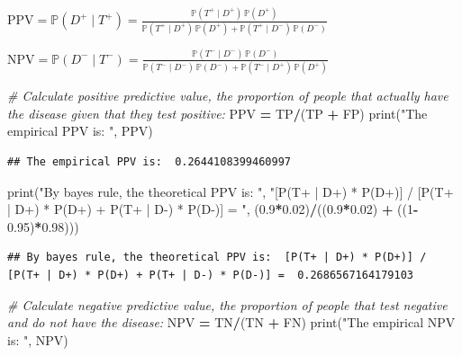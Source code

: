 \documentclass[
]{article}
\newenvironment{Shaded}{\begin{snugshade}}{\end{snugshade}}
\newcommand{\BuiltInTok}[1]{#1}
\newcommand{\CommentTok}[1]{\textcolor[rgb]{0.56,0.35,0.01}{\textit{#1}}}
\newcommand{\DecValTok}[1]{\textcolor[rgb]{0.00,0.00,0.81}{#1}}
\newcommand{\FloatTok}[1]{\textcolor[rgb]{0.00,0.00,0.81}{#1}}
\newcommand{\NormalTok}[1]{#1}
\newcommand{\OperatorTok}[1]{\textcolor[rgb]{0.81,0.36,0.00}{\textbf{#1}}}
\newcommand{\StringTok}[1]{\textcolor[rgb]{0.31,0.60,0.02}{#1}}
\begin{document}
\(\text{PPV} = \mathbb{P}(D^+ \mid T^+) = \frac{\mathbb{P}(T^+ \mid D^+)\,\mathbb{P}(D^+)}{\mathbb{P}(T^+ \mid D^+)\,\mathbb{P}(D^+) + \mathbb{P}(T^+ \mid D^-)\,\mathbb{P}(D^-)}\)

\(\text{NPV} = \mathbb{P}(D^- \mid T^-) = \frac{\mathbb{P}(T^- \mid D^-)\,\mathbb{P}(D^-)}{\mathbb{P}(T^- \mid D^-)\,\mathbb{P}(D^-) + \mathbb{P}(T^- \mid D^+)\,\mathbb{P}(D^+)}\)

\begin{Shaded}
\begin{Highlighting}[]
\CommentTok{\# Calculate positive predictive value, the proportion of people that actually have the disease given that they test positive:}
\NormalTok{PPV }\OperatorTok{=}\NormalTok{ TP}\OperatorTok{/}\NormalTok{(TP }\OperatorTok{+}\NormalTok{ FP)}
\BuiltInTok{print}\NormalTok{(}\StringTok{"The empirical PPV is: "}\NormalTok{, PPV) }
\end{Highlighting}
\end{Shaded}

\begin{verbatim}
## The empirical PPV is:  0.2644108399460997
\end{verbatim}

\begin{Shaded}
\begin{Highlighting}[]
\BuiltInTok{print}\NormalTok{(}\StringTok{"By bayes rule, the theoretical PPV is: "}\NormalTok{, }\StringTok{"[P(T+ | D+) * P(D+)] / [P(T+ | D+) * P(D+) + P(T+ | D{-}) * P(D{-})] = "}\NormalTok{, (}\FloatTok{0.9}\OperatorTok{*}\FloatTok{0.02}\NormalTok{)}\OperatorTok{/}\NormalTok{((}\FloatTok{0.9}\OperatorTok{*}\FloatTok{0.02}\NormalTok{) }\OperatorTok{+}\NormalTok{ ((}\DecValTok{1}\OperatorTok{{-}}\FloatTok{0.95}\NormalTok{)}\OperatorTok{*}\FloatTok{0.98}\NormalTok{)))}
\end{Highlighting}
\end{Shaded}

\begin{verbatim}
## By bayes rule, the theoretical PPV is:  [P(T+ | D+) * P(D+)] / [P(T+ | D+) * P(D+) + P(T+ | D-) * P(D-)] =  0.2686567164179103
\end{verbatim}

\begin{Shaded}
\begin{Highlighting}[]
\CommentTok{\# Calculate negative predictive value, the proportion of people that test negative and do not have the disease:}
\NormalTok{NPV }\OperatorTok{=}\NormalTok{ TN}\OperatorTok{/}\NormalTok{(TN }\OperatorTok{+}\NormalTok{ FN)}
\BuiltInTok{print}\NormalTok{(}\StringTok{"The empirical NPV is: "}\NormalTok{, NPV)}
\end{Highlighting}
\end{Shaded}
\end{document}
